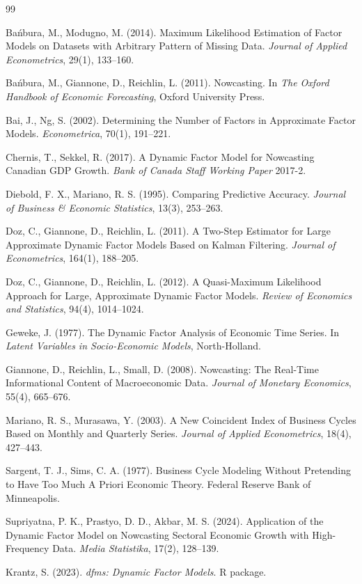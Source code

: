 \documentclass[11pt,a4paper]{report}
\begin{document}
\begin{thebibliography}{99}

 Bańbura, M., Modugno, M. (2014). Maximum Likelihood Estimation of Factor Models on Datasets with Arbitrary Pattern of Missing Data. \textit{Journal of Applied Econometrics}, 29(1), 133--160.

 Bańbura, M., Giannone, D., Reichlin, L. (2011). Nowcasting. In \textit{The Oxford Handbook of Economic Forecasting}, Oxford University Press.

 Bai, J., Ng, S. (2002). Determining the Number of Factors in Approximate Factor Models. \textit{Econometrica}, 70(1), 191--221.

 Chernis, T., Sekkel, R. (2017). A Dynamic Factor Model for Nowcasting Canadian GDP Growth. \textit{Bank of Canada Staff Working Paper} 2017-2.

 Diebold, F. X., Mariano, R. S. (1995). Comparing Predictive Accuracy. \textit{Journal of Business \& Economic Statistics}, 13(3), 253--263.

 Doz, C., Giannone, D., Reichlin, L. (2011). A Two-Step Estimator for Large Approximate Dynamic Factor Models Based on Kalman Filtering. \textit{Journal of Econometrics}, 164(1), 188--205.

 Doz, C., Giannone, D., Reichlin, L. (2012). A Quasi-Maximum Likelihood Approach for Large, Approximate Dynamic Factor Models. \textit{Review of Economics and Statistics}, 94(4), 1014--1024.

 Geweke, J. (1977). The Dynamic Factor Analysis of Economic Time Series. In \textit{Latent Variables in Socio-Economic Models}, North-Holland.

 Giannone, D., Reichlin, L., Small, D. (2008). Nowcasting: The Real-Time Informational Content of Macroeconomic Data. \textit{Journal of Monetary Economics}, 55(4), 665--676.

 Mariano, R. S., Murasawa, Y. (2003). A New Coincident Index of Business Cycles Based on Monthly and Quarterly Series. \textit{Journal of Applied Econometrics}, 18(4), 427--443.

 Sargent, T. J., Sims, C. A. (1977). Business Cycle Modeling Without Pretending to Have Too Much A Priori Economic Theory. Federal Reserve Bank of Minneapolis.

 Supriyatna, P. K., Prastyo, D. D., Akbar, M. S. (2024). Application of the Dynamic Factor Model on Nowcasting Sectoral Economic Growth with High-Frequency Data. \textit{Media Statistika}, 17(2), 128--139.

 Krantz, S. (2023). \textit{dfms: Dynamic Factor Models}. R package.

\end{thebibliography}
\end{document}
